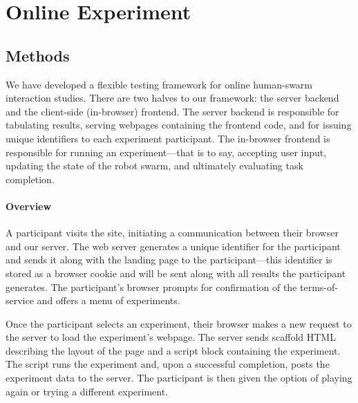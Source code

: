 \section{Online Experiment}
\label{sec:expMethods}


\subsection{Methods}

We have developed a flexible testing framework for online human-swarm interaction studies. There are two halves to our framework: the server backend and the client-side (in-browser) frontend. The server backend is responsible for tabulating results, serving webpages containing the frontend code, and for issuing unique identifiers to each experiment participant. The in-browser frontend is responsible for running an experiment---that is to say, accepting user input, updating the state of the robot swarm, and ultimately evaluating task completion.

\paragraph{Overview}

A participant visits the site, initiating a communication between their browser and our server. The web server generates a unique identifier for the participant and sends it along with the landing page to the participant---this identifier is stored as a browser cookie and will be sent along with all results the participant generates. The participant's browser prompts for confirmation of the terms-of-service and offers a menu of experiments.

Once the participant selects an experiment, their browser makes a new request to the server to load the experiment's webpage. The server sends scaffold HTML describing the layout of the page and a script block containing the experiment. The script runs the experiment and, upon a successful completion, posts the experiment data to the server. The participant is then given the option of playing again or trying a different experiment.

